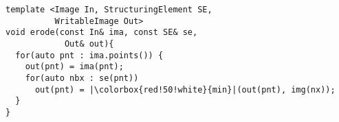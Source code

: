 \documentclass[varwidth=8cm, border={0.1cm 0.1cm 0.1cm 0.1cm}]{standalone}
\begin{document}
\begin{verbatim}
template <Image In, StructuringElement SE,
          WritableImage Out>
void erode(const In& ima, const SE& se,
            Out& out){
  for(auto pnt : ima.points()) {
    out(pnt) = ima(pnt);
    for(auto nbx : se(pnt))
      out(pnt) = |\colorbox{red!50!white}{min}|(out(pnt), img(nx));
  }
}
\end{verbatim}
\end{document}
